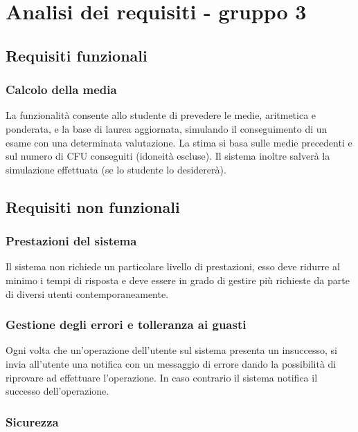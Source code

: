 
\chapter{Analisi dei requisiti - gruppo 3}
\label{ref:requisiti3}


\section{Requisiti funzionali}

\subsection{Calcolo della media}
La funzionalità consente allo studente di prevedere le medie, aritmetica e ponderata, e la base di laurea aggiornata, simulando il conseguimento di un esame con una determinata valutazione. La stima si basa sulle medie precedenti e sul numero di CFU conseguiti (idoneità escluse). Il sistema inoltre salverà la simulazione effettuata (se lo studente lo desidererà).

\section{Requisiti non funzionali}

\subsection{Prestazioni del sistema} 

Il sistema non richiede un particolare livello di prestazioni, esso deve ridurre al minimo i tempi di risposta e deve essere in grado di gestire più richieste da parte di diversi utenti contemporaneamente.
\subsection{Gestione degli errori e tolleranza ai guasti}

Ogni volta che un’operazione dell’utente sul sistema presenta un insuccesso, si invia all’utente una notifica con un messaggio di errore dando la possibilità di riprovare ad effettuare l’operazione. In caso contrario il sistema notifica il successo dell’operazione.

\subsection{Sicurezza}

